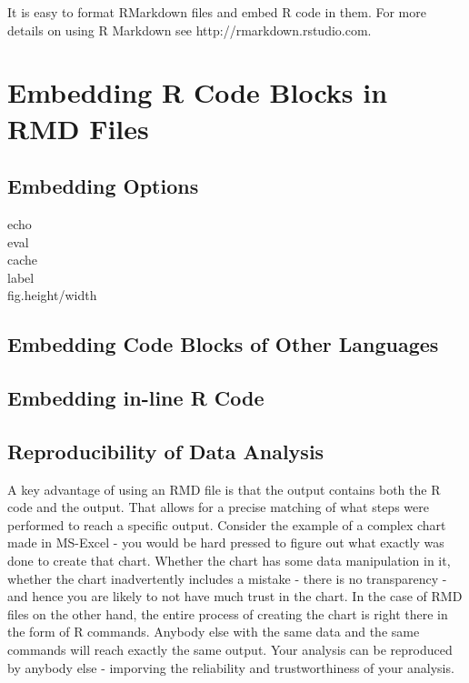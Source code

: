 \documentclass[10pt, letterpaper, twoside]{memoir}\usepackage{knitr}
\begin{document}
It is easy to format RMarkdown files and embed R code in them. For more details on using R Markdown see http://rmarkdown.rstudio.com.

\section{Embedding R Code Blocks in RMD Files}

\subsection{Embedding Options}

\begin{description}
  \item[echo]
  \item[eval]
  \item[cache]
  \item[label]
  \item[fig.height/width]
\end{description}

\subsection{Embedding Code Blocks of Other Languages }


\subsection{Embedding in-line R Code}


\subsection{Reproducibility of Data Analysis}

A key advantage of using an RMD file is that the output contains both the R code and the output. That allows for a precise matching of what steps were performed to reach a specific output. Consider the example of a complex chart made in MS-Excel - you would be hard pressed to figure out what exactly was done to create that chart. Whether the chart has some data manipulation in it, whether the chart inadvertently includes a mistake - there is no transparency - and hence you are likely to not have much trust in the chart. In the case of RMD files on the other hand, the entire process of creating the chart is right there in the form of R commands. Anybody else with the same data and the same commands will reach exactly the same output. Your analysis can be reproduced by anybody else - imporving the reliability and trustworthiness of your analysis.
\end{document}
